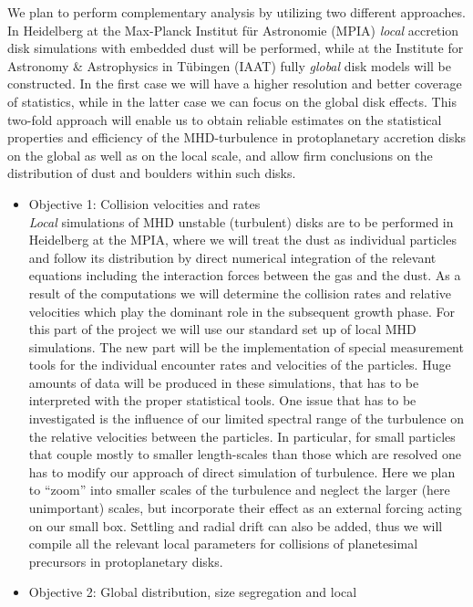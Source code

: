 We plan to perform complementary analysis by utilizing two different
approaches.  In Heidelberg at the Max-Planck Institut f\"ur Astronomie
(MPIA) {\it local} accretion disk simulations with embedded dust will be
performed, while at the Institute for Astronomy \& Astrophysics in
T\"ubingen (IAAT) fully {\it global} disk models will be constructed.  In
the first case we will have a higher resolution and better coverage of
statistics, while in the latter case we can focus on the global disk
effects.  This two-fold approach will enable us to obtain reliable estimates
on the statistical properties and efficiency of the MHD-turbulence in
protoplanetary accretion disks on the global as well as on the local scale,
and allow firm conclusions on the distribution of dust and boulders within
such disks.
% 
%
\begin{itemize}
\item Objective 1: {\sf Collision velocities and rates}\\
{\em Local} simulations of MHD unstable (turbulent) disks are to be
performed in Heidelberg at the MPIA, where we will treat the dust as
individual particles and follow its distribution by direct numerical
integration of the relevant equations including the interaction forces
between the gas and the dust.  As a result of the computations we will
determine the collision rates and relative velocities which play the
dominant role in the subsequent growth phase.
%
For this part of the project we will use our standard set up of local MHD
simulations. The new part will be the implementation of special measurement
tools for the individual encounter rates and velocities of the
particles. Huge amounts of data will be produced in these simulations, that
has to be interpreted with the proper statistical tools. One issue that has
to be investigated is the influence of our limited spectral range of the
turbulence on the relative velocities between the particles.  In particular,
for small particles that couple mostly to smaller length-scales than those
which are resolved one has to modify our approach of direct simulation of
turbulence. Here we plan to ``zoom'' into smaller scales of the turbulence
and neglect the larger (here unimportant) scales, but incorporate their
effect as an external forcing acting on our small box.  Settling and radial
drift can also be added, thus we will compile all the relevant local
parameters for collisions of planetesimal precursors in protoplanetary
disks.
%
\item Objective 2: {\sf Global distribution, size segregation and local
}
\end{itemize}
